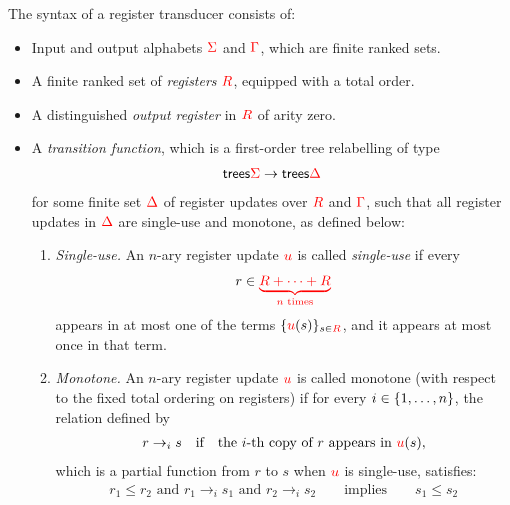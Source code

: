 \begin{definition}\label{def:stt}
The syntax of a register transducer consists of: 
\begin{itemize}
    \item Input and output alphabets ${\color{red}{\Sigma}}$ and ${\color{red}{\Gamma}}$, which are finite ranked sets.
    \item A finite ranked set of \emph{registers} ${{\color{red}{R}}}$, equipped with a total order.
    \item A distinguished \emph{output register} in ${{\color{red}{R}}}$ of arity zero.
    \item A \emph{transition function}, which is a  first-order tree relabelling of type
    \begin{align*}
      \mathsf {trees}{{\color{red}{\Sigma}}} \to \mathsf {trees}{{\color{red}{\Delta}}}
    \end{align*}for some finite set ${\color{red}{\Delta}}$ of  register updates over ${{\color{red}{R}}}$ and ${\color{red}{\Gamma}}$, 
    such that all register updates in  ${\color{red}{\Delta}}$ are single-use and monotone, as defined below:
    \begin{enumerate}
        \item \emph{Single-use.}  An $n$-ary register update ${\color{red}{u}}$ is  called  \emph{single-use} if   every
        \begin{align*}
            r \in {\color{red}{\underbrace{{{\color{red}{R}}}+ \cdots + {{\color{red}{R}}}}_{\text{$n$ times}}}}
        \end{align*}
        appears in at most one of the terms $\{{\color{red}{u}}(s)\}_{s \in {{\color{red}{R}}}}$, and it appears at most once in that term. 
        \item \emph{Monotone.} An $n$-ary  register update ${\color{red}{u}}$ is called monotone (with respect to the fixed total ordering on registers) if for every $i \in \{1,\ldots,n\}$, the relation defined by
        \begin{align*} 
            r \to_i s \quad \text{if} \quad  \text{the $i$-th copy of $r$ appears in ${\color{red}{u}}(s)$},
        \end{align*}
        which is a partial function from $r$ to $s$ when ${\color{red}{u}}$ is single-use, satisfies:
        \begin{align*}
            r_1 \leq r_2 \text{ and } r_1 \to_i s_1 \text{ and } r_2 \to_i s_2  \qquad \text{implies} \qquad  s_1 \leq s_2
        \end{align*}
    \end{enumerate}
\end{itemize}
\end{definition}

